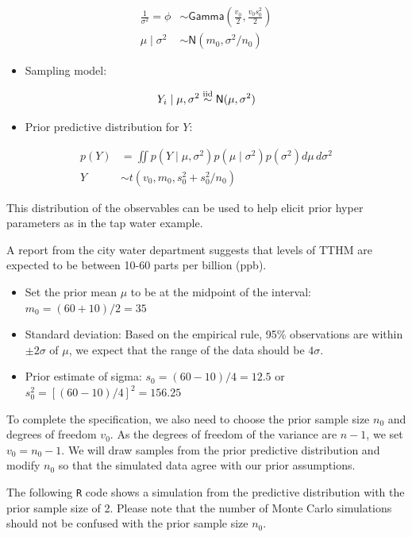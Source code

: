 \documentclass[]{book}
\providecommand{\tightlist}{%
  \setlength{\itemsep}{0pt}\setlength{\parskip}{0pt}}
\theoremstyle{definition}
\theoremstyle{definition}
\theoremstyle{definition}
\theoremstyle{remark}
\begin{document}
\[ \begin{aligned}
\frac{1}{\sigma^2} = \phi &\sim \textsf{Gamma}\left(\frac{v_0}{2}, \frac{v_0 s^2_0}{2} \right) \\
\mu \mid \sigma^2  &\sim  \textsf{N}(m_0, \sigma^2/n_0)
\end{aligned} \]

\begin{itemize}
\tightlist
\item
  Sampling model:
\end{itemize}

\[Y_i \mid \mu,\sigma^2 \mathrel{\mathop{\sim}\limits^{\rm iid}} \textsf{N}(\mu, \sigma^2) \]

\begin{itemize}
\tightlist
\item
  Prior predictive distribution for \(Y\):
\end{itemize}

\[\begin{aligned}
p(Y) &= \iint p(Y \mid \mu,\sigma^2) p(\mu \mid \sigma^2) p(\sigma^2) d\mu \, d\sigma^2 \\
Y &\sim t(v_0, m_0, s_0^2+s_0^2/n_0)
\end{aligned}\]

This distribution of the observables can be used to help elicit prior
hyper parameters as in the tap water example.

A report from the city water department suggests that levels of TTHM are
expected to be between 10-60 parts per billion (ppb).

\begin{itemize}
\item
  Set the prior mean \(\mu\) to be at the midpoint of the interval:
  \(m_0 = (60+10)/2 = 35\)
\item
  Standard deviation: Based on the empirical rule, 95\% observations are
  within \(\pm 2\sigma\) of \(\mu\), we expect that the range of the
  data should be \(4\sigma\).
\item
  Prior estimate of sigma: \(s_0 = (60-10)/4 = 12.5\) or
  \(s_0^2 = [(60-10)/4]^2 = 156.25\)
\end{itemize}

To complete the specification, we also need to choose the prior sample
size \(n_0\) and degrees of freedom \(v_0\). As the degrees of freedom
of the variance are \(n-1\), we set \(v_0 = n_0 - 1\). We will draw
samples from the prior predictive distribution and modify \(n_0\) so
that the simulated data agree with our prior assumptions.

The following \texttt{R} code shows a simulation from the predictive
distribution with the prior sample size of 2. Please note that the
number of Monte Carlo simulations should not be confused with the prior
sample size \(n_0\).
\end{document}
